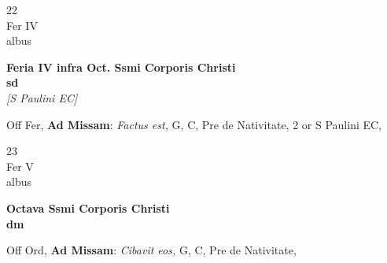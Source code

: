 \documentclass[10pt, openany]{book}
\begin{document}
        \begin{center}
            \begin{minipage}{3.5in}
                \vspace{2em}
                \begin{minipage}{0.5in}
                    {\Huge 22} \\
                    {\normalsize Fer IV} \\
                    {\normalsize albus}
                \end{minipage}
                \begin{minipage}{3.0in}
                    \textbf{ \large Feria IV infra Oct. Ssmi Corporis Christi \\
                    \textnormal{\normalsize sd}} \\ \textit{[S Paulini EC]} \\ 
                \end{minipage}
                \begin{justify}Off Fer, \textbf{Ad Missam}: \textit{Factus est,} G, C, Pre de Nativitate, 2 or S Paulini EC,   
                \end{justify}
            \end{minipage}
        \end{center}
    
        \begin{center}
            \begin{minipage}{3.5in}
                \vspace{2em}
                \begin{minipage}{0.5in}
                    {\Huge 23} \\
                    {\normalsize Fer V} \\
                    {\normalsize albus}
                \end{minipage}
                \begin{minipage}{3.0in}
                    \textbf{ \large Octava Ssmi Corporis Christi \\
                    \textnormal{\normalsize dm}} \\ 
                \end{minipage}
                \begin{justify}Off Ord, \textbf{Ad Missam}: \textit{Cibavit eos,} G, C, Pre de Nativitate,   
                \end{justify}
            \end{minipage}
        \end{center}
    
\end{document}
